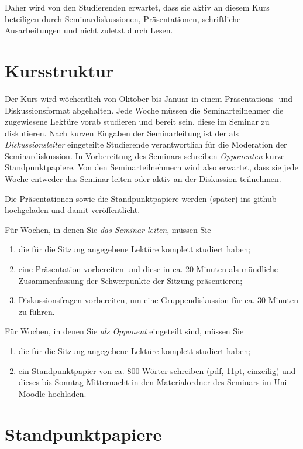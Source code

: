 \documentclass[11pt,a4paper]{article}
\begin{document}
Daher wird von den Studierenden erwartet, dass sie aktiv an diesem Kurs
beteiligen durch Seminardiskussionen, Präsentationen, schriftliche
Ausarbeitungen und nicht zuletzt durch Lesen.

\section{Kursstruktur}

Der Kurs wird wöchentlich von Oktober bis Januar in einem Präsentations- und
Diskussionsformat abgehalten.  Jede Woche müssen die Seminarteilnehmer die
zugewiesene Lektüre vorab studieren und bereit sein, diese im Seminar zu
diskutieren. Nach kurzen Eingaben der Seminarleitung ist der als
\emph{Diskussionsleiter} eingeteilte Studierende verantwortlich für die
Moderation der Seminardiskussion. In Vorbereitung des Seminars schreiben
\emph{Opponenten} kurze Standpunktpapiere.  Von den Seminarteilnehmern wird also
erwartet, dass sie jede Woche entweder das Seminar leiten oder aktiv an der
Diskussion teilnehmen.

Die Präsentationen sowie die Standpunktpapiere werden (später) ins github
hochgeladen und damit veröffentlicht.

Für Wochen, in denen Sie \emph{das Seminar leiten}, müssen Sie
\begin{enumerate}
\item die für die Sitzung angegebene Lektüre komplett studiert haben;
\item eine Präsentation vorbereiten und diese in ca. 20 Minuten als mündliche
  Zusammenfassung der Schwerpunkte der Sitzung präsentieren;
\item Diskussionsfragen vorbereiten, um eine Gruppendiskussion für ca. 30
  Minuten zu führen.
\end{enumerate}
Für Wochen, in denen Sie \emph{als Opponent} eingeteilt sind, müssen Sie
\begin{enumerate}
\item die für die Sitzung angegebene Lektüre komplett studiert haben;
\item ein Standpunktpapier von ca. 800 Wörter schreiben (pdf, 11pt, einzeilig)
  und dieses bis Sonntag Mitternacht in den Materialordner des Seminars im
  Uni-Moodle hochladen.
\end{enumerate}
\section{Standpunktpapiere}
\end{document}
